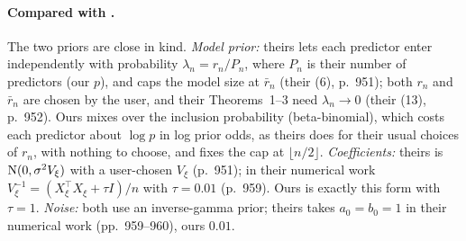 \paragraph{Compared with \SL.} The two priors are close in kind. \emph{Model prior:} theirs lets each predictor enter
independently with probability $\lambda_n=r_n/P_n$, where $P_n$ is their number of predictors (our $p$), and caps the model size at $\bar r_n$ (their (6), p.~951); both $r_n$
and $\bar r_n$ are chosen by the user, and their Theorems~1--3 need $\lambda_n\to0$ (their (13), p.~952). Ours mixes over the inclusion probability
(beta-binomial), which costs each predictor about $\log p$ in log prior odds, as theirs does for their usual choices of $r_n$, with nothing to choose, and fixes the cap at
$\lfloor n/2\rfloor$. \emph{Coefficients:} theirs is $\mathrm{N}(0,\sigma^2V_\xi)$ with a user-chosen $V_\xi$ (p.~951); in
their numerical work $V_\xi^{-1}=(X_\xi^\top X_\xi+\tau I)/n$ with $\tau=0.01$ (p.~959). Ours is exactly this form with
$\tau=1$. \emph{Noise:} both use an inverse-gamma prior; theirs takes $a_0=b_0=1$ in their numerical work (pp.~959--960), ours
$0.01$.

